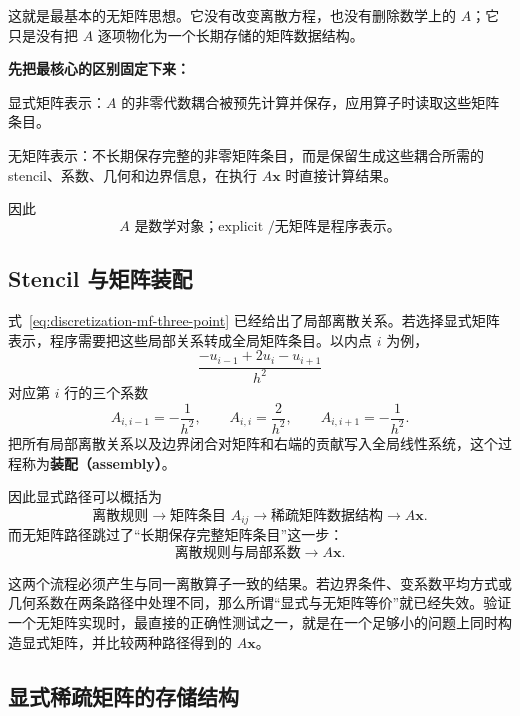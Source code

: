 这就是最基本的无矩阵思想。它没有改变离散方程，也没有删除数学上的 $A$；它只是没有把 $A$ 逐项物化为一个长期存储的矩阵数据结构。

\begin{keybox}
\textbf{先把最核心的区别固定下来：}

显式矩阵表示：$A$ 的非零代数耦合被预先计算并保存，应用算子时读取这些矩阵条目。

无矩阵表示：不长期保存完整的非零矩阵条目，而是保留生成这些耦合所需的 stencil、系数、几何和边界信息，在执行 $A\bm x$ 时直接计算结果。

因此
\[
\boxed{
A\text{ 是数学对象；explicit /无矩阵是程序表示。}
}
\]
\end{keybox}

\subsection{Stencil 与矩阵装配}

式~\eqref{eq:discretization-mf-three-point} 已经给出了局部离散关系。若选择显式矩阵表示，程序需要把这些局部关系转成全局矩阵条目。以内点 $i$ 为例，
\begin{equation}
\frac{-u_{i-1}+2u_i-u_{i+1}}{h^2}
\end{equation}
对应第 $i$ 行的三个系数
\begin{equation}
A_{i,i-1}=-\frac1{h^2},
\qquad
A_{i,i}=\frac2{h^2},
\qquad
A_{i,i+1}=-\frac1{h^2}.
\label{eq:discretization-assembly-row}
\end{equation}
把所有局部离散关系以及边界闭合对矩阵和右端的贡献写入全局线性系统，这个过程称为\textbf{装配（assembly）}。

因此显式路径可以概括为
\begin{equation}
\boxed{
\text{离散规则}
\longrightarrow
\text{矩阵条目 }A_{ij}
\longrightarrow
\text{稀疏矩阵数据结构}
\longrightarrow
A\bm x.
}
\label{eq:discretization-explicit-path}
\end{equation}
而无矩阵路径跳过了“长期保存完整矩阵条目”这一步：
\begin{equation}
\boxed{
\text{离散规则与局部系数}
\longrightarrow
A\bm x.
}
\label{eq:discretization-matrixfree-path}
\end{equation}

这两个流程必须产生与同一离散算子一致的结果。若边界条件、变系数平均方式或几何系数在两条路径中处理不同，那么所谓“显式与无矩阵等价”就已经失效。验证一个无矩阵实现时，最直接的正确性测试之一，就是在一个足够小的问题上同时构造显式矩阵，并比较两种路径得到的 $A\bm x$。

\subsection{显式稀疏矩阵的存储结构}


